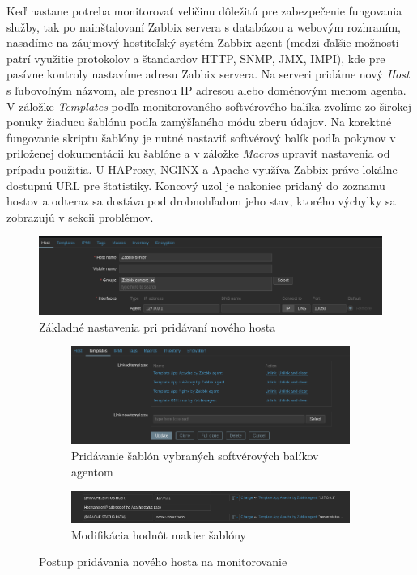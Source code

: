\documentclass[12pt, a4paper]{article}
\begin{document}
Keď nastane potreba monitorovať veličinu dôležitú pre zabezpečenie fungovania služby, tak po nainštalovaní
Zabbix servera s databázou a webovým rozhraním, nasadíme na záujmový hostiteľský systém Zabbix agent
(medzi ďalšie možnosti patrí využitie protokolov a štandardov HTTP, SNMP, JMX, IMPI), kde pre pasívne 
kontroly nastavíme adresu Zabbix servera. Na serveri pridáme nový \emph{Host} s ľubovoľným názvom, 
ale presnou IP adresou  alebo doménovým menom agenta. V záložke \emph{Templates} podľa monitorovaného 
softvérového balíka zvolíme zo širokej ponuky žiaducu šablónu podľa zamýšľaného módu zberu údajov. Na 
korektné fungovanie skriptu šablóny je nutné nastaviť softvérový balík podľa pokynov v priloženej 
dokumentácii ku šablóne a v záložke \emph{Macros} upraviť nastavenia od prípadu použitia. U HAProxy, 
NGINX a Apache využíva Zabbix práve lokálne dostupnú URL pre štatistiky. Koncový uzol je nakoniec pridaný
do zoznamu hostov a odteraz sa dostáva pod drobnohľadom jeho stav, ktorého výchylky sa zobrazujú
v sekcii problémov.
\begin{figure}[h]
	\centering
  	\includegraphics[width=\textwidth]{images/host-config.png}
  	\caption{Základné nastavenia pri pridávaní nového hosta}
\end{figure}

\begin{figure}[h]
	\centering
	\begin{subfigure}[t]{\textwidth}
  		\centering
  		\includegraphics[width=\textwidth]{images/zabbix-templates.png}
  		\caption{Pridávanie šablón vybraných softvérových balíkov agentom}
	\end{subfigure}
	\begin{subfigure}[t]{\textwidth}
  		\centering
  		\includegraphics[width=\textwidth]{images/zabbix-macros.png}
  		\caption{Modifikácia hodnôt makier šablóny}
	\end{subfigure}
	\caption{Postup pridávania nového hosta na monitorovanie}
\end{figure}
\end{document}
